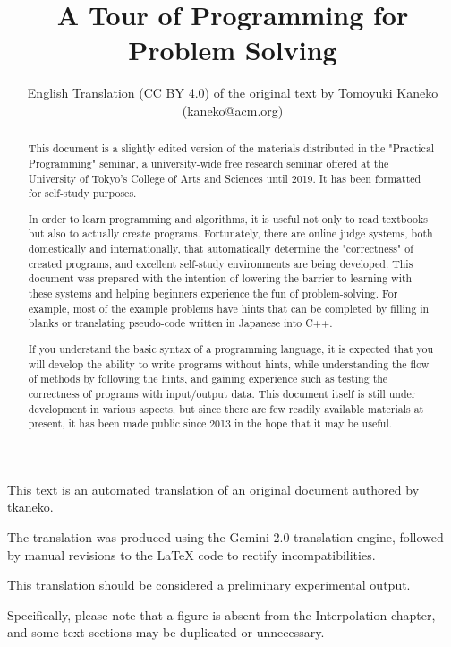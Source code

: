 \documentclass[report]{book}
\title{A Tour of Programming for Problem Solving}
\author{English Translation (CC BY 4.0) of the original text by Tomoyuki Kaneko (kaneko@acm.org)}
\date{}
\begin{document}
\maketitle

\begin{versionoutside}
 
\begin{abstract}
This document is a slightly edited version of the materials distributed in the "Practical Programming" seminar, a university-wide free research seminar offered at the University of Tokyo's College of Arts and Sciences until 2019. It has been formatted for self-study purposes.

In order to learn programming and algorithms, it is useful not only to read textbooks but also to actually create programs. Fortunately, there are online judge systems, both domestically and internationally, that automatically determine the "correctness" of created programs, and excellent self-study environments are being developed. This document was prepared with the intention of lowering the barrier to learning with these systems and helping beginners experience the fun of problem-solving. For example, most of the example problems have hints that can be completed by filling in blanks or translating pseudo-code written in Japanese into C++.

If you understand the basic syntax of a programming language, it is expected that you will develop the ability to write programs without hints, while understanding the flow of methods by following the hints, and gaining experience such as testing the correctness of programs with input/output data. This document itself is still under development in various aspects, but since there are few readily available materials at present, it has been made public since 2013 in the hope that it may be useful.
\end{abstract}
\end{versionoutside}

This text is an automated translation of an original document authored by tkaneko.

The translation was produced using the Gemini 2.0 translation engine, followed by manual revisions to the LaTeX code to rectify incompatibilities.

This translation should be considered a preliminary experimental output.

Specifically, please note that a figure is absent from the Interpolation chapter,
and some text sections may be duplicated or unnecessary.
\end{document}

